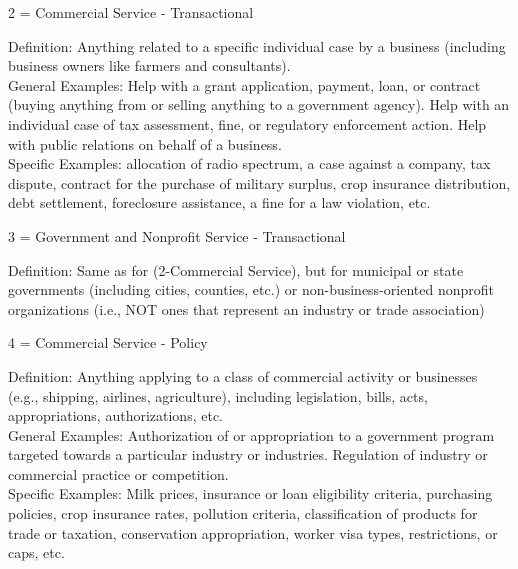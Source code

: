 \documentclass[12pt]{article}
\begin{document}
{2 = Commercial Service - Transactional \\

\hfill\begin{minipage}{\dimexpr\textwidth-2cm}
Definition: Anything related to a specific individual case by a business (including business owners like farmers and consultants).\\ 
General Examples: Help with a grant application, payment, loan, or contract (buying anything from or selling anything to a government agency). Help with an individual case of tax assessment, fine, or regulatory enforcement action. Help with public relations on behalf of a business.\\
Specific Examples: allocation of radio spectrum, a case against a company, tax dispute, contract for the purchase of military surplus, crop insurance distribution, debt settlement, foreclosure assistance, a fine for a law violation, etc. \\
\end{minipage}

3 = Government and Nonprofit Service - Transactional\\

\hfill\begin{minipage}{\dimexpr\textwidth-2cm}
Definition: Same as for (2-Commercial Service), but for municipal or state governments (including cities, counties, etc.) or non-business-oriented nonprofit organizations (i.e., NOT ones that represent an industry or trade association) \\
\end{minipage}

4 = Commercial Service - Policy \\

\hfill\begin{minipage}{\dimexpr\textwidth-2cm}
Definition: Anything applying to a class of commercial activity or businesses (e.g., shipping, airlines, agriculture), including legislation, bills, acts, appropriations, authorizations, etc. \\
General Examples: Authorization of or appropriation to a government program targeted towards a particular industry or industries. Regulation of industry or commercial practice or competition.\\
Specific Examples: Milk prices, insurance or loan eligibility criteria, purchasing policies, crop insurance rates, pollution criteria, classification of products for trade or taxation, conservation appropriation, worker visa types, restrictions, or caps, etc.\\
\end{minipage}
 
}
\end{document}
